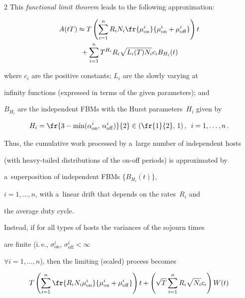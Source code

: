 \begin{multicols}{2}
This \textit{functional limit theorem} leads to the following approximation:

\begin{multline*}

A(tT)\approx T\left( \sum\limits_{i=1}^n R_i N_i

\fr{\mu_{\mathrm{on}}^i}{\mu_{\mathrm{on}}^i+\mu_{\mathrm{off}}^i} \right)t \\

{}+ \sum\limits_{i=1}^n

T^{H_i}R_i \sqrt{L_i(T)N_i}c_i B_{H_i}(t) 


\end{multline*}

where $c_i$ are the positive constants; $L_i$ are the slowly varying at

infinity functions (expressed in terms of the given  parameters); and

$B_{H_i}$ are the independent FBMs with the Hurst parameters~$H_i$ given by

$$

H_i=\fr{3-\min(\alpha_{\mathrm{on}}^i,\,\alpha_{\mathrm{off}}^i)}{2}\in

\left(\fr{1}{2},\,1 \right),\enskip i=1,\ldots, n\,.

$$

Thus, the cumulative work processed by a~large number of independent hosts 

(with heavy-tailed distributions of the on-off periods) is approximated by 

a~superposition of independent FBMs  $\{B_{H_i}(t)\}$, 

$i=1,\dots,n$,  with a~linear drift that depends on the rates~$R_i$ and 

the average duty cycle.



Instead, if for all types of hosts the variances of the sojourn times 

are finite (i.\,e., $\sigma_{\mathrm{on}}^i,\,\sigma_{\mathrm{off}}^i<\infty$ 

$\forall i=1,\dots,n$), then the limiting (scaled) process becomes

\begin{equation*}

T\left( \sum\limits_{i=1}^n \fr{R_i N_i \mu_{\mathrm{on}}^i}{\mu_{\mathrm{on}}^i+\mu_{\mathrm{off}}^i}

\right)t + \left(\sqrt{T}\sum\limits_{i=1}^n R_i \sqrt{N_i}c_i \right)W(t)


\end{equation*}
\end{multicols}
